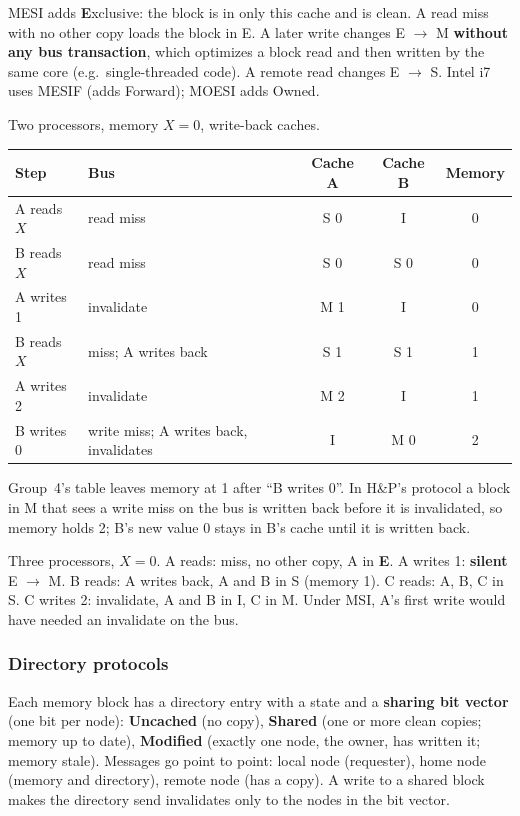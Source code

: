 \begin{definition}
MESI adds \textbf{E}xclusive: the block is in only this cache and is clean. A read
miss with no other copy loads the block in E. A later write changes E $\to$ M
\textbf{without any bus transaction}, which optimizes a block read and then written
by the same core (e.g.\ single-threaded code). A remote read changes E $\to$ S. Intel
i7 uses MESIF (adds Forward); MOESI adds Owned.
\end{definition}

\begin{eg}
Two processors, memory $X=0$, write-back caches.
\begin{center}
\small
\begin{tabular}{@{}llccc@{}}
\toprule
Step & Bus & Cache A & Cache B & Memory \\
\midrule
A reads $X$ & read miss & S 0 & I & 0 \\
B reads $X$ & read miss & S 0 & S 0 & 0 \\
A writes 1 & invalidate & M 1 & I & 0 \\
B reads $X$ & miss; A writes back & S 1 & S 1 & 1 \\
A writes 2 & invalidate & M 2 & I & 1 \\
B writes 0 & write miss; A writes back, invalidates & I & M 0 & 2 \\
\bottomrule
\end{tabular}
\end{center}
\end{eg}
\begin{remark}
\slidefix{} Group~4's table leaves memory at 1 after ``B writes 0''. In H\&P's
protocol a block in M that sees a write miss on the bus is written back before it
is invalidated, so memory holds 2; B's new value 0 stays in B's cache until it is
written back.
\end{remark}

\begin{eg}
Three processors, $X=0$. A reads: miss, no other copy, A in \textbf{E}. A writes 1:
\textbf{silent} E $\to$ M. B reads: A writes back, A and B in S (memory 1). C reads:
A, B, C in S. C writes 2: invalidate, A and B in I, C in M. Under MSI, A's first
write would have needed an invalidate on the bus.
\end{eg}

\subsubsection{Directory protocols}
Each memory block has a directory entry with a state and a \textbf{sharing bit
vector} (one bit per node): \textbf{Uncached} (no copy), \textbf{Shared} (one or more
clean copies; memory up to date), \textbf{Modified} (exactly one node, the owner, has
written it; memory stale). Messages go point to point: local node (requester), home
node (memory and directory), remote node (has a copy). A write to a shared block
makes the directory send invalidates only to the nodes in the bit
vector.

